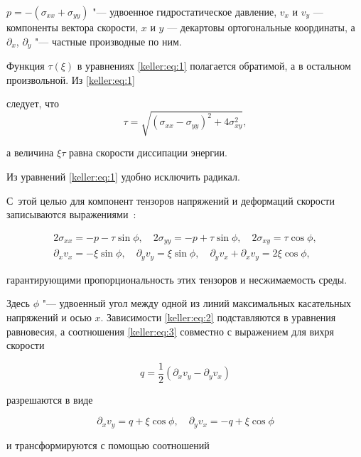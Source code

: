 $p=-(\sigma_{xx}+\sigma_{yy})$ "--- удвоенное гидростатическое давление, $v_x$ и $v_y$ --- компоненты вектора скорости, $x$ и $y$ --- декартовы ортогональные координаты, а $\partial_x$, $\partial_y$ "--- частные производные по ним. 

Функция $\tau(\xi)$ в уравнениях \eqref{keller:eq:1} полагается обратимой, а в остальном произвольной. Из \eqref{keller:eq:1} 

следует, что $$\tau =\sqrt{\left(\sigma_{xx}-\sigma_{yy}\right)^{2} +4\sigma_{xy}^{2} },$$ 

а величина $ \xi\tau$ равна скорости диссипации энергии.



Из уравнений \eqref{keller:eq:1} удобно исключить радикал. 

С~этой целью для компонент тензоров напряжений и деформаций скорости записываются выражениями~\cite{keller:bib:Frei}:

\begin{gather} \label{keller:eq:2}

2\sigma_{xx}=-p-\tau\sin\phi,\quad 2\sigma_{yy}=-p+\tau\sin\phi,\quad 2\sigma_{xy}=\tau\cos\phi,

\\ \label{keller:eq:3}

\partial_x v_x=-\xi\sin\phi,\quad \partial_y v_y=\xi\sin\phi,\quad \partial_y v_x+\partial_x v_y=2\xi\cos\phi,

\end{gather}

гарантирующими пропорциональность этих тензоров и несжимаемость среды. 

Здесь $\phi$ "--- удвоенный угол между одной из линий максимальных касательных напряжений и осью $x$. Зависимости \eqref{keller:eq:2} подставляются в уравнения равновесия, а соотношения \eqref{keller:eq:3} совместно с выражением для вихря скорости

\begin{equation}\label{keller:eq:4}

	q=\frac{1}{2}\left(\partial_x v_y-\partial_y v_x\right)

\end{equation}

разрешаются в виде

$$

\partial_x v_y =q+\xi\cos\phi,\quad \partial_y v_x=-q+\xi\cos\phi

$$ 

и трансформируются с помощью соотношений

